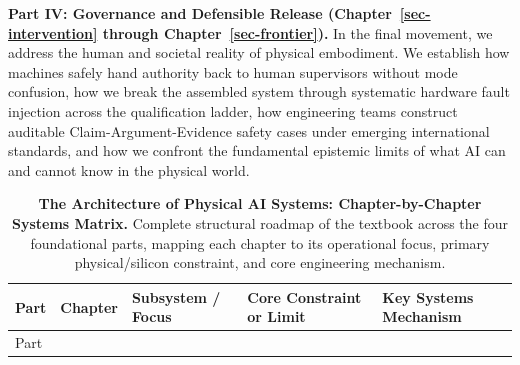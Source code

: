 \documentclass[
  10pt,
  letterpaper,
  twoside,
  openright,
  numbers=noenddot,
  headings=standardclasses
]{scrbook}
\begin{document}
\textbf{Part IV: Governance and Defensible Release
(Chapter~\ref{sec-intervention} through Chapter~\ref{sec-frontier}).} In
the final movement, we address the human and societal reality of
physical embodiment. We establish how machines safely hand authority
back to human supervisors without mode confusion, how we break the
assembled system through systematic hardware fault injection across the
qualification ladder, how engineering teams construct auditable
Claim-Argument-Evidence safety cases under emerging international
standards, and how we confront the fundamental epistemic limits of what
AI can and cannot know in the physical world.

\begin{longtable}[]{@{}
  >{\raggedright\arraybackslash}p{}
  >{\raggedright\arraybackslash}p{}
  >{\raggedright\arraybackslash}p{}
  >{\raggedright\arraybackslash}p{}
  >{\raggedright\arraybackslash}p{}@{}}
\caption{\textbf{The Architecture of Physical AI Systems:
Chapter-by-Chapter Systems Matrix.} Complete structural roadmap of the
textbook across the four foundational parts, mapping each chapter to its
operational focus, primary physical/silicon constraint, and core
engineering mechanism.}\label{tbl-01-book-roadmap}\tabularnewline
\toprule\noalign{}
\begin{minipage}[b]{\linewidth}\raggedright
Part
\end{minipage} & \begin{minipage}[b]{\linewidth}\raggedright
Chapter
\end{minipage} & \begin{minipage}[b]{\linewidth}\raggedright
Subsystem / Focus
\end{minipage} & \begin{minipage}[b]{\linewidth}\raggedright
Core Constraint or Limit
\end{minipage} & \begin{minipage}[b]{\linewidth}\raggedright
Key Systems Mechanism
\end{minipage} \\
\midrule\noalign{}
\endfirsthead
\toprule\noalign{}
\begin{minipage}[b]{\linewidth}\raggedright
Part
\end{minipage} & \begin{minipage}[b]{\linewidth}\raggedright

\end{minipage}
\end{longtable}
\end{document}
